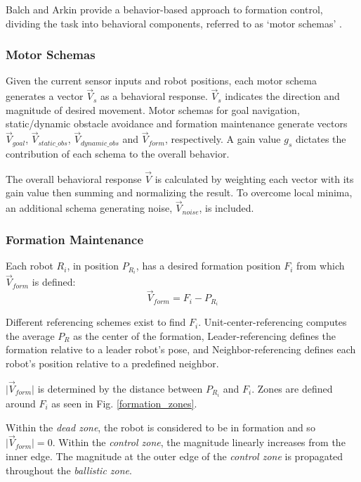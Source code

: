 \documentclass[letterpaper, 10 pt, conference]{ieeeconf}  %
\begin{document}
Balch and Arkin provide a behavior-based approach to formation control, dividing the task into behavioral components, referred to as `motor schemas' \cite{c2}. 

\subsubsection*{Motor Schemas}

Given the current sensor inputs and robot positions, each motor schema generates a vector $\vec{V}_s$ as a behavioral response. $\vec{V}_s$ indicates the direction and magnitude of desired movement. Motor schemas for goal navigation, static/dynamic obstacle avoidance and formation maintenance generate vectors $\vec{V}_{goal}$, $\vec{V}_{static\_obs}$, $\vec{V}_{dynamic\_obs}$ and $\vec{V}_{form}$, respectively. A gain value $g_s$ dictates the contribution of each schema to the overall behavior.  

The overall behavioral response $\vec{V}$ is calculated by weighting each vector with its gain value then summing and normalizing the result. To overcome local minima, an additional schema generating noise,  $\vec{V}_{noise}$, is included.

\subsubsection*{Formation Maintenance}
Each robot $R_i$, in position $P_{R_i}$, has a desired formation position $F_i$ from which $\vec{V}_{form}$ is defined:
\[\vec{V}_{form} = F_i - P_{R_i}\]

Different referencing schemes exist to find $F_i$. Unit-center-referencing computes the average $P_R$ as the center of the formation, Leader-referencing defines the formation relative to a leader robot's pose, and Neighbor-referencing defines each robot's position relative to a predefined neighbor.

$\lvert\vec{V}_{form}\rvert$ is determined by the distance between $P_{R_i}$ and $F_i$. Zones are defined around $F_{i}$ as seen in Fig. \ref{formation_zones}. 

Within the \textit{dead zone}, the robot is considered to be in formation and so $\lvert\vec{V}_{form}\rvert = 0$. Within the \textit{control zone}, the magnitude linearly increases from the inner edge. The magnitude at the outer edge of the \textit{control zone} is propagated throughout the \textit{ballistic zone}.
\end{document}
